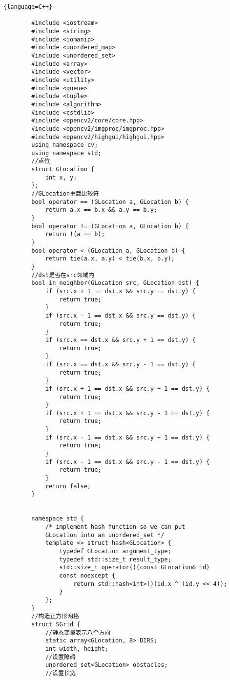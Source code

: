 \documentclass[withoutpreface,bwprint]{cumcmthesis} %
\begin{document}
\begin{appendix}
\begin{lstlisting}{language=C++}
    
        #include <iostream>
        #include <string>
        #include <iomanip>
        #include <unordered_map>
        #include <unordered_set>
        #include <array>
        #include <vector>
        #include <utility>
        #include <queue>
        #include <tuple>
        #include <algorithm>
        #include <cstdlib>
        #include <opencv2/core/core.hpp>
        #include <opencv2/imgproc/imgproc.hpp>
        #include <opencv2/highgui/highgui.hpp>
        using namespace cv;
        using namespace std;
        //点位
        struct GLocation {
            int x, y;
        };
        //GLocation重载比较符
        bool operator == (GLocation a, GLocation b) {
            return a.x == b.x && a.y == b.y;
        }
        bool operator != (GLocation a, GLocation b) {
            return !(a == b);
        }
        bool operator < (GLocation a, GLocation b) {
            return tie(a.x, a.y) < tie(b.x, b.y);
        }
        //dst是否在src邻域内
        bool in_neighbor(GLocation src, GLocation dst) {
            if (src.x + 1 == dst.x && src.y == dst.y) {
                return true;
            }
            if (src.x - 1 == dst.x && src.y == dst.y) {
                return true;
            }
            if (src.x == dst.x && src.y + 1 == dst.y) {
                return true;
            }
            if (src.x == dst.x && src.y - 1 == dst.y) {
                return true;
            }
            if (src.x + 1 == dst.x && src.y + 1 == dst.y) {
                return true;
            }
            if (src.x + 1 == dst.x && src.y - 1 == dst.y) {
                return true;
            }
            if (src.x - 1 == dst.x && src.y + 1 == dst.y) {
                return true;
            }
            if (src.x - 1 == dst.x && src.y - 1 == dst.y) {
                return true;
            }
            return false;
        }
        
        
        namespace std {
            /* implement hash function so we can put 
            GLocation into an unordered_set */
            template <> struct hash<GLocation> {
                typedef GLocation argument_type;
                typedef std::size_t result_type;
                std::size_t operator()(const GLocation& id) 
                const noexcept {
                    return std::hash<int>()(id.x ^ (id.y << 4));
                }
            };
        }
        //构造正方形网格
        struct SGrid {
            //静态变量表示八个方向
            static array<GLocation, 8> DIRS;
            int width, height;
            //设置障碍
            unordered_set<GLocation> obstacles;
            //设置长宽
        

\end{lstlisting}
\end{appendix}
\end{document}
